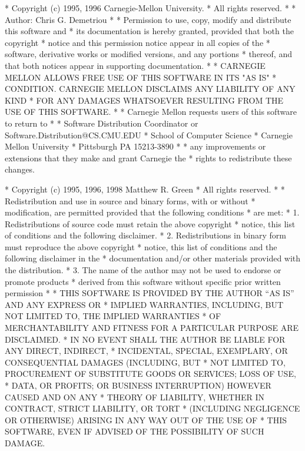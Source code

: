 \begin{copyrightEnv}
 * Copyright (c) 1995, 1996 Carnegie-Mellon University.
 * All rights reserved.
 *
 * Author: Chris G. Demetriou
 * 
 * Permission to use, copy, modify and distribute this software and
 * its documentation is hereby granted, provided that both the copyright
 * notice and this permission notice appear in all copies of the
 * software, derivative works or modified versions, and any portions
 * thereof, and that both notices appear in supporting documentation.
 * 
 * CARNEGIE MELLON ALLOWS FREE USE OF THIS SOFTWARE IN ITS "AS IS" 
 * CONDITION.  CARNEGIE MELLON DISCLAIMS ANY LIABILITY OF ANY KIND 
 * FOR ANY DAMAGES WHATSOEVER RESULTING FROM THE USE OF THIS SOFTWARE.
 * 
 * Carnegie Mellon requests users of this software to return to
 *
 *  Software Distribution Coordinator  or  Software.Distribution@CS.CMU.EDU
 *  School of Computer Science
 *  Carnegie Mellon University
 *  Pittsburgh PA 15213-3890
 *
 * any improvements or extensions that they make and grant Carnegie the
 * rights to redistribute these changes.
\end{copyrightEnv}

\begin{copyrightEnv}
 * Copyright (c) 1995, 1996, 1998 Matthew R. Green
 * All rights reserved.
 *
 * Redistribution and use in source and binary forms, with or without
 * modification, are permitted provided that the following conditions
 * are met:
 * 1. Redistributions of source code must retain the above copyright
 *    notice, this list of conditions and the following disclaimer.
 * 2. Redistributions in binary form must reproduce the above copyright
 *    notice, this list of conditions and the following disclaimer in the
 *    documentation and/or other materials provided with the distribution.
 * 3. The name of the author may not be used to endorse or promote products
 *    derived from this software without specific prior written permission
 *
 * THIS SOFTWARE IS PROVIDED BY THE AUTHOR ``AS IS'' AND ANY EXPRESS OR
 * IMPLIED WARRANTIES, INCLUDING, BUT NOT LIMITED TO, THE IMPLIED WARRANTIES
 * OF MERCHANTABILITY AND FITNESS FOR A PARTICULAR PURPOSE ARE DISCLAIMED.
 * IN NO EVENT SHALL THE AUTHOR BE LIABLE FOR ANY DIRECT, INDIRECT,
 * INCIDENTAL, SPECIAL, EXEMPLARY, OR CONSEQUENTIAL DAMAGES (INCLUDING, BUT
 * NOT LIMITED TO, PROCUREMENT OF SUBSTITUTE GOODS OR SERVICES; LOSS OF USE,
 * DATA, OR PROFITS; OR BUSINESS INTERRUPTION) HOWEVER CAUSED AND ON ANY
 * THEORY OF LIABILITY, WHETHER IN CONTRACT, STRICT LIABILITY, OR TORT
 * (INCLUDING NEGLIGENCE OR OTHERWISE) ARISING IN ANY WAY OUT OF THE USE OF
 * THIS SOFTWARE, EVEN IF ADVISED OF THE POSSIBILITY OF SUCH DAMAGE.
\end{copyrightEnv}

